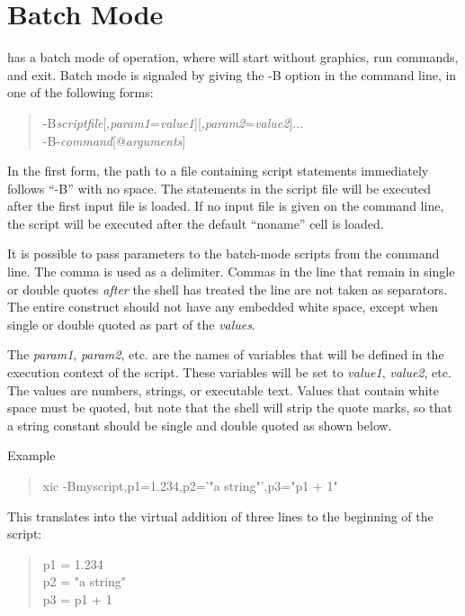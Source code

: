 \section{Batch Mode}
\label{batchmode}

{\Xic} has a batch mode of operation, where {\Xic} will start without
graphics, run commands, and exit.  Batch mode is signaled by giving
the {\vt -B} option in the command line, in one of the following
forms:
\begin{quote}
{\vt -B}{\it scriptfile}[,{\it param1\/}={\it value1\/}][,{\it param2\/}={\it value2\/}]...\\
{\vt -B-}{\it command}[{\vt @}{\it arguments}]
\end{quote}
 
In the first form, the path to a file containing {\Xic} script
statements immediately follows ``{\vt -B}'' with no space.  The
statements in the script file will be executed after the first input
file is loaded.  If no input file is given on the command line, the
script will be executed after the default ``noname'' cell is loaded.
 
It is possible to pass parameters to the batch-mode scripts from the
command line.  The comma is used as a delimiter.  Commas in the line
that remain in single or double quotes {\it after} the shell has
treated the line are not taken as separators.  The entire construct
should not have any embedded white space, except when single or double
quoted as part of the {\it values}.
 
The {\it param1}, {\it param2}, etc.  are the names of variables that
will be defined in the execution context of the script.  These
variables will be set to {\it value1}, {\it value2}, etc.  The
values are numbers, strings, or executable text.  Values that contain
white space must be quoted, but note that the shell will strip the
quote marks, so that a string constant should be single and double
quoted as shown below.
 
Example
\begin{quote}
{\vt xic -Bmyscript,p1=1.234,p2='"a string"',p3="p1 + 1"}
\end{quote}
 
This translates into the virtual addition of three lines to the
beginning of the script:
\begin{quote}\vt
p1 = 1.234\\
p2 = "a string"\\
p3 = p1 + 1
\end{quote}

